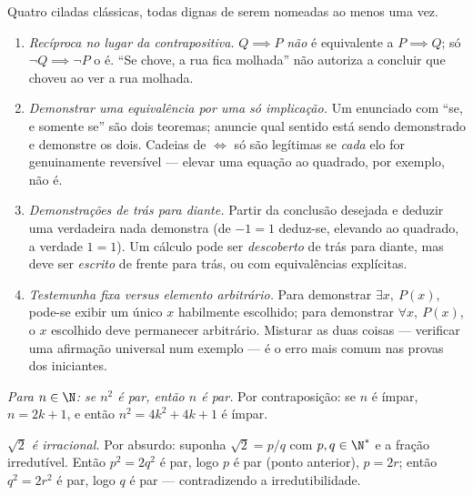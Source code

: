 \begin{remark}\label{rem:b1:logic:pitfalls}
Quatro ciladas clássicas, todas dignas de serem nomeadas ao menos uma vez.
\begin{enumerate}
  \item \emph{Recíproca no lugar da contrapositiva.} $Q \implies P$
        \emph{não} é equivalente a $P \implies Q$; só $\lnot Q
        \implies \lnot P$ o é. ``Se chove, a rua fica molhada''
        não autoriza a concluir que choveu ao ver a rua molhada.
  \item \emph{Demonstrar uma equivalência por uma só implicação.} Um
        enunciado com ``se, e somente se'' são dois teoremas; anuncie qual
        sentido está sendo demonstrado e demonstre os dois. Cadeias de
        $\iff$ só são legítimas se \emph{cada} elo for genuinamente
        reversível --- elevar uma equação ao quadrado, por exemplo, não é.
  \item \emph{Demonstrações de trás para diante.} Partir da conclusão
        desejada e deduzir uma  verdadeira nada demonstra
        (de $-1 = 1$ deduz-se, elevando ao quadrado, a verdade $1 = 1$).
        Um cálculo pode ser \emph{descoberto} de trás para diante, mas
        deve ser \emph{escrito} de frente para trás, ou com equivalências
        explícitas.
  \item \emph{Testemunha fixa versus elemento arbitrário.} Para demonstrar
        $\exists x,\ P(x)$, pode-se exibir um único $x$ habilmente
        escolhido; para demonstrar $\forall x,\ P(x)$, o $x$ escolhido
        deve permanecer arbitrário. Misturar as duas coisas --- verificar
        uma afirmação universal num exemplo --- é o erro mais comum nas
        provas dos iniciantes.
\end{enumerate}
\end{remark}

\begin{example}\label{ex:b1:logic:sqrt2}
\emph{Para $n \in \N$: se $n^2$ é par, então $n$ é par.} Por
contraposição: se $n$ é ímpar, $n = 2k+1$, e então
$n^2 = 4k^2 + 4k + 1$ é ímpar.

\emph{$\sqrt 2$ é irracional.} Por absurdo: suponha
$\sqrt 2 = p/q$ com $p, q \in \N^*$ e a fração irredutível.
Então $p^2 = 2q^2$ é par, logo $p$ é par (ponto anterior), $p = 2r$;
então $q^2 = 2r^2$ é par, logo $q$ é par --- contradizendo a
irredutibilidade.
\end{example}

